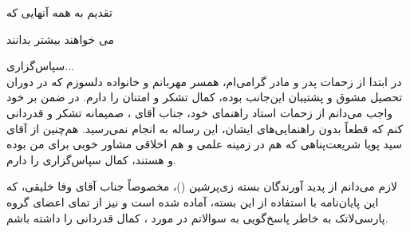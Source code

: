 \newpage
\vspace{4cm}

{\nastaliq
{\Huge
 تقدیم به همه آنهایی که 
\vspace{1.5cm}

\hspace{3cm}
می خواهند بیشتر بدانند
}}


\newpage
{ \nastaliq \LARGE
سپاس‌گزاری...
}
\\[2cm]
در ابتدا از زحمات پدر و مادر گرامی‌‌ام، همسر مهربانم و خانواده دلسوزم  که در دوران تحصیل مشوق و پشتیبان این‌جانب بوده، کمال تشکر و امتنان را دارم. در ضمن بر خود واجب می‌دانم از زحمات استاد  راهنمای خود، جناب آقای 
\supervisorText،
 صمیمانه تشکر و  قدردانی کنم  که قطعاً بدون  راهنمایی‌های‌ ایشان، این رساله  به انجام نمی‌رسید. هم‌چنین از آقای سید پویا شریعت‌پناهی که هم در زمینه علمی و هم اخلاقی مشاور خوبی برای من بوده و هستند، کمال سپاس‌گزاری را دارم. 

لازم می‌دانم از پدید آورندگان بسته زی‌پرشین (\lr{\XePersian})، مخصوصاً جناب آقای  وفا خلیقی، که این پایان‌نامه با استفاده از این بسته، آماده شده است و نیز از تمای اعضای گروه پارسی‌لاتک به خاطر پاسخ‌گویی به سوالاتم در مورد  \lr{\LaTeX}،  کمال قدردانی را داشته باشم.


